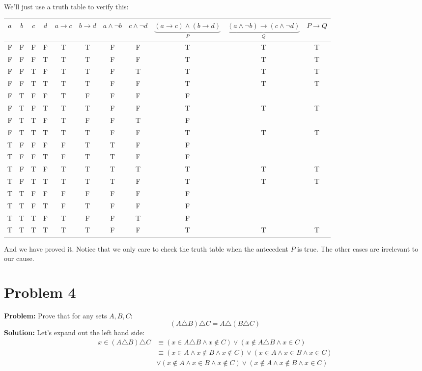 \documentclass{article}
\begin{document}
We'll just use a truth table to verify this:
\begin{center}
\begin{tabular}{c|c|c|c|c|c|c|c|c|c|c}
$a$ & $b$ & $c$ & $d$ & $a\rightarrow c$ & $b\rightarrow d$ & $a\wedge\neg b$ & $c\wedge\neg d$ & $\underbrace{(a\rightarrow c)\wedge(b\rightarrow d)}_{P}$ & $\underbrace{(a\wedge\neg b)\rightarrow(c\wedge\neg d)}_{Q}$ & $P\rightarrow Q$\\
\hline
F&F&F&F &T&T &F&F &T&T&T\\
F&F&F&T &T&T &F&F &T&T&T\\
F&F&T&F &T&T &F&T &T&T&T\\
F&F&T&T &T&T &F&F &T&T&T\\
F&T&F&F &T&F &F&F &F&&\\
F&T&F&T &T&T &F&F &T&T&T\\
F&T&T&F &T&F &F&T &F&&\\
F&T&T&T &T&T &F&F &T&T&T\\
T&F&F&F &F&T &T&F &F&&\\
T&F&F&T &F&T &T&F &F&&\\
T&F&T&F &T&T &T&T &T&T&T\\
T&F&T&T &T&T &T&F &T&T&T\\
T&T&F&F &F&F &F&F &F&&\\
T&T&F&T &F&T &F&F &F&&\\
T&T&T&F &T&F &F&T &F&&\\
T&T&T&T &T&T &F&F &T&T&T\\
\end{tabular}
\end{center}

And we have proved it. Notice that we only care to check the truth table when the antecedent $P$ is true. The other cases are irrelevant to our cause.

\section*{Problem 4}
\textbf{Problem:} Prove that for any sets $A,B,C$:
$$(A\triangle B)\triangle C=A\triangle (B\triangle C)$$
\textbf{Solution:} Let's expand out the left hand side:
\begin{align*}
  x\in (A\triangle B)\triangle C&\equiv(x\in A\triangle B\wedge x\not\in C)\vee(x\not\in A\triangle B\wedge x\in C)\\
  &\equiv(x\in A\wedge x\not\in B\wedge x\not\in C)\vee(x\in A\wedge x\in B\wedge x\in C)\\
  &\vee(x\not\in A\wedge x\in B\wedge x\not\in C)\vee(x\not\in A\wedge x\not\in B\wedge x\in C)\\
\end{align*}
\end{document}
